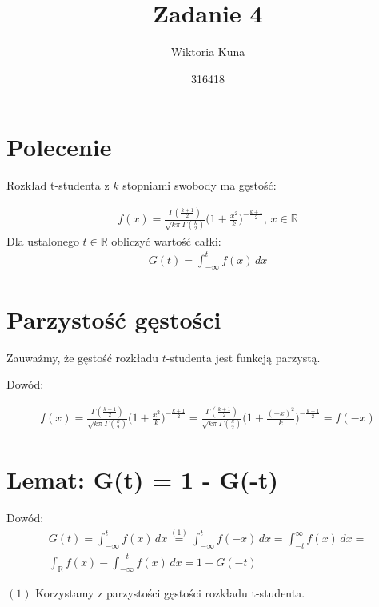\documentclass{article}
\title{\myfont Zadanie 4}
\author{Wiktoria Kuna}
\date{316418}
\begin{document}
\setlength{\parindent}{0.5ex}
\setlength{\parskip}{1.5ex}
\maketitle

\section*{Polecenie}

Rozkład t-studenta z $k$ stopniami swobody ma gęstość:

\begin{gather*}
    f(x) = \frac{\Gamma{(\frac{k+1}{2} )}}{\sqrt{k \pi} \Gamma{(\frac{k}{2})}}\Big(1 + \frac{x^2}{k}\Big)^{-\frac{k+1}{2}}, \, x \in \mathbb{R}
\end{gather*}
Dla ustalonego $t \in \mathbb{R}$ obliczyć wartość całki:
\begin{gather*}
    G(t) = \int_{-\infty}^t f(x) \, dx
\end{gather*}




\section*{Parzystość gęstości}

Zauważmy, że gęstość rozkładu $t$-studenta jest funkcją parzystą. 

Dowód:

\begin{gather*}
    f(x) = \frac{\Gamma{(\frac{k+1}{2} )}}{\sqrt{k \pi} \Gamma{(\frac{k}{2})}}\Big(1 + \frac{x^2}{k}\Big)^{-\frac{k+1}{2}} = \frac{\Gamma{(\frac{k+1}{2} )}}{\sqrt{k \pi} \Gamma{(\frac{k}{2})}}\Big(1 + \frac{(-x)^2}{k}\Big)^{-\frac{k+1}{2}} = f(-x)
\end{gather*}

\section*{Lemat: G(t) = 1 - G(-t)}

Dowód:
\begin{gather*}
    G(t) = \int_{-\infty}^t f(x) \, dx \stackrel{(1)}{=} 
    \int_{-\infty}^t f(-x) \, dx = 
    \int_{-t}^{\infty} f(x) \, dx =\\
    \int_\mathbb{R} f(x) -  \int_{-\infty}^{-t} f(x) \, dx = 1 - G(-t)
\end{gather*}


$(1)$ Korzystamy z parzystości gęstości rozkładu t-studenta.
\end{document}
